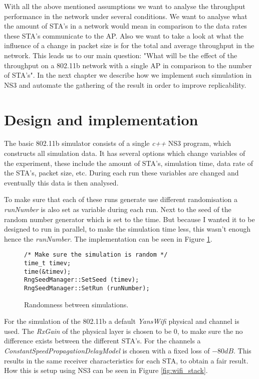\documentclass[]{article}
\begin{document}
With all the above mentioned assumptions we want to analyse the throughput performance in the network under several conditions.
We want to analyse what the amount of STA's in a network would mean in comparison to the data rates these STA's communicate to the AP.
Also we want to take a look at what the influence of a change in packet size is for the total and average throughput in the network.
This leads us to our main question: "What will be the effect of the throughput on a 802.11b network with a single AP in comparison to the number of STA's". 
In the next chapter we describe how we implement such simulation in NS3 and automate the gathering of the result in order to improve replicability.

\newpage
\section{Design and implementation}
The basic 802.11b simulator consists of a single \textit{c++} NS3 program, which constructs all simulation data.
It has several options which change variables of the experiment, these include the amount of STA's, simulation time, data rate of the STA's, packet size, etc.
During each run these variables are changed and eventually this data is then analysed.

To make sure that each of these runs generate use different randomisation a \textit{runNumber} is also set as variable during each run.
Next to the seed of the random number generator which is set to the time.
But because I wanted it to be designed to run in parallel, to make the simulation time less, this wasn't enough hence the \textit{runNumber}.
The implementation can be seen in Figure \ref{fig:random}.

\begin{figure}[H]
\begin{lstlisting}[frame=bt]
/* Make sure the simulation is random */
time_t timev;
time(&timev);
RngSeedManager::SetSeed (timev);
RngSeedManager::SetRun (runNumber);
\end{lstlisting}
\caption{Randomness between simulations.\label{fig:random}}
\end{figure}

For the simulation of the 802.11b a default \textit{YansWifi} physical and channel is used.
The \textit{RxGain} of the physical layer is chosen to be $0$, to make sure the no difference exists between the different STA's.
For the channels a \textit{ConstantSpeedPropagationDelayModel} is chosen with a fixed loss of $-80dB$.
This results in the same receiver characteristics for each STA, to obtain a fair result.
How this is setup using NS3 can be seen in Figure \ref{fig:wifi_stack}.
\end{document}
